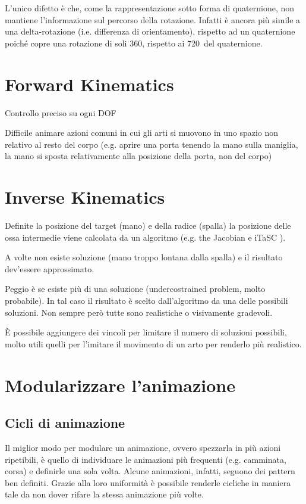 L'unico difetto è che, come la rappresentazione sotto forma di quaternione, non mantiene l'informazione sul percorso della rotazione. Infatti è ancora più simile a una delta-rotazione (i.e. differenza di orientamento), rispetto ad un quaternione poiché copre una rotazione di soli 360\textdegree, rispetto ai 720\textdegree\ del quaternione. 


\section{Forward Kinematics} \label{sectionFK}
Controllo preciso su ogni DOF

Difficile animare azioni comuni in cui gli arti si muovono in uno spazio non relativo al resto del corpo (e.g. aprire una porta tenendo la mano sulla maniglia, la mano si sposta relativamente alla posizione della porta, non del corpo)
\section{Inverse Kinematics} \label{sectionIK}
Definite la posizione del target (mano) e della radice (spalla) la posizione delle ossa intermedie viene calcolata da un algoritmo (e.g. the Jacobian \cite{Parent:2012:CAA:2385444} e iTaSC \cite{blendWiki}).

A volte non esiste soluzione (mano troppo lontana dalla spalla) e il risultato dev'essere approssimato.

Peggio è se esiste più di una soluzione (undercostrained problem, molto probabile). In tal caso il risultato è scelto dall'algoritmo da una delle possibili soluzioni. Non sempre però tutte sono realistiche o visivamente gradevoli.

È possibile aggiungere dei vincoli per limitare il numero di soluzioni possibili, molto utili quelli per l'imitare il movimento di un arto per renderlo più realistico.
\section{Modularizzare l'animazione}
\subsection{Cicli di animazione}
Il miglior modo per modulare un animazione, ovvero spezzarla in più azioni ripetibili, è quello di individuare le animazioni più frequenti (e.g. camminata, corsa) e definirle una sola volta.
Alcune animazioni, infatti, seguono dei pattern ben definiti.
Grazie alla loro uniformità è possibile renderle cicliche in maniera tale da non dover rifare la stessa animazione più volte.
